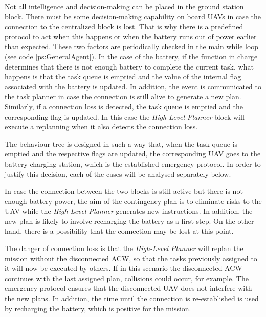 Not all intelligence and decision-making can be placed in the ground station block. There must be some decision-making capability on board \glspl{UAV} in case the connection to the centralized block is lost. That is why there is a predefined protocol to act when this happens or when the battery runs out of power earlier than expected. These two factors are periodically checked in the main while loop (see code \ref{ps:GeneralAgent}). In the case of the battery, if the function in charge determines that there is not enough battery to complete the current task, what happens is that the task queue is emptied and the value of the internal flag associated with the battery is updated. In addition, the event is communicated to the task planner in case the connection is still alive to generate a new plan. Similarly, if a connection loss is detected, the task queue is emptied and the corresponding flag is updated. In this case the \emph{High-Level Planner} block will execute a replanning when it also detects the connection loss.

The behaviour tree is designed in such a way that, when the task queue is emptied and the respective flags are updated, the corresponding \gls{UAV} goes to the battery charging station, which is the established emergency protocol. In order to justify this decision, each of the cases will be analysed separately below.

In case the connection between the two blocks is still active but there is not enough battery power, the aim of the contingency plan is to eliminate risks to the \gls{UAV} while the \emph{High-Level Planner} generates new instructions. In addition, the new plan is likely to involve recharging the battery as a first step. On the other hand, there is a possibility that the connection may be lost at this point.

The danger of connection loss is that the \emph{High-Level Planner} will replan the mission without the disconnected \gls{ACW}, so that the tasks previously assigned to it will now be executed by others. If in this scenario the disconnected \gls{ACW} continues with the last assigned plan, collisions could occur, for example. The emergency protocol ensures that the disconnected \gls{UAV} does not interfere with the new plans. In addition, the time until the connection is re-established is used by recharging the battery, which is positive for the mission.


